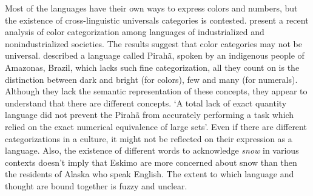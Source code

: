 Most of the languages have their own ways to express colors and numbers, but the existence of cross-linguistic universals 
categories is contested. \cite{regier2003} present a recent analysis of color categorization among languages of
industrialized and nonindustrialized societies. The results suggest that color categories may not be
universal. \cite{everett2005} described a language called Pirahã, spoken by 
an indigenous people of Amazonas, Brazil, which lacks such fine categorization, all they count on is the distinction 
between dark and bright (for colors), few and many (for numerals). 
Although they lack the semantic representation of these concepts, they appear to understand that there are different concepts. 
`A total lack of exact quantity language did not prevent the Pirahã from accurately performing a task which relied on 
the exact numerical equivalence of large sets'\citep{frank2008}.
Even if there are different categorizations in a culture, it might not be reflected on their 
expression as a language. Also, the existence of different words to acknowledge \textit{snow} in various
contexts doesn't imply that Eskimo are more concerned about snow than then the residents of Alaska who speak English.
The extent to which language and thought are bound together is fuzzy and unclear.


